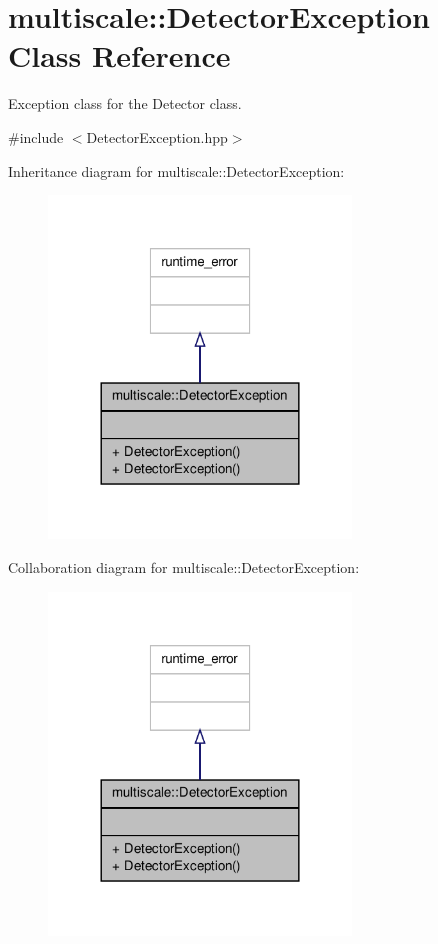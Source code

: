 \hypertarget{classmultiscale_1_1DetectorException}{\section{multiscale\-:\-:Detector\-Exception Class Reference}
\label{classmultiscale_1_1DetectorException}
}


Exception class for the Detector class.  




{\ttfamily \#include $<$Detector\-Exception.\-hpp$>$}



Inheritance diagram for multiscale\-:\-:Detector\-Exception\-:\nopagebreak
\begin{figure}[H]
\begin{center}
\leavevmode
\includegraphics[width=228pt]{classmultiscale_1_1DetectorException__inherit__graph}
\end{center}
\end{figure}


Collaboration diagram for multiscale\-:\-:Detector\-Exception\-:\nopagebreak
\begin{figure}[H]
\begin{center}
\leavevmode
\includegraphics[width=228pt]{classmultiscale_1_1DetectorException__coll__graph}
\end{center}
\end{figure}
